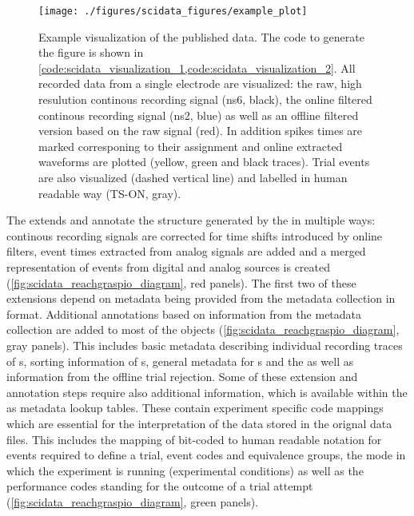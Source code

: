 \begin{figure}
 \texttt{[image: ./figures/scidata\_figures/example\_plot]}
 \caption[Example visualization of the published data]{Example visualization of the published data. The code to generate the figure is shown in \cref{code:scidata_visualization_1,code:scidata_visualization_2}. All recorded data from a single electrode are visualized: the raw, high resulution continous recording signal (ns6, black), the online filtered continous recording signal (ns2, blue) as well as an offline filtered version based on the raw signal (red). In addition spikes times are marked corresponing to their  assignment and online extracted waveforms are plotted (yellow, green and black traces). Trial events are also visualized (dashed vertical line) and labelled in human readable way (TS-ON, gray).}
 \label{fig:scidata_visualization}
\end{figure}

The  extends and annotate the  structure generated by the  in multiple ways: continous recording signals are corrected for time shifts introduced by online filters, event times extracted from analog signals are added and a merged representation of events from digital and analog sources is created (\cref{fig:scidata_reachgraspio_diagram}, red panels). The first two of these extensions depend on metadata being provided from the metadata collection in  format. Additional annotations based on information from the metadata collection are added to most of the  objects (\cref{fig:scidata_reachgraspio_diagram}, gray panels). This includes basic metadata describing individual recording traces of s, sorting information of s, general metadata for s and the   as well as information from the offline trial rejection. Some of these extension and annotation steps require also additional information, which is available within the  as metadata lookup tables. These contain experiment specific code mappings which are essential for the interpretation of the data stored in the orignal  data files. This includes the mapping of bit-coded to human readable notation for events required to define a trial, event codes and equivalence groups, the mode in which the experiment is running (experimental conditions) as well as the performance codes standing for the outcome of a trial attempt (\cref{fig:scidata_reachgraspio_diagram}, green panels). 


